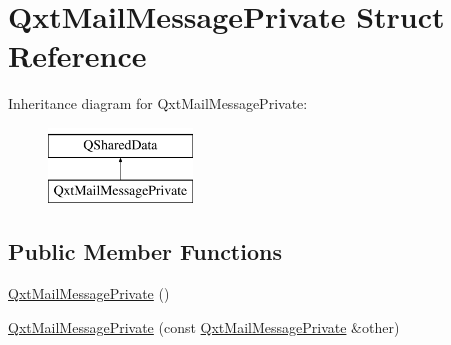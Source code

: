 \hypertarget{struct_qxt_mail_message_private}{\section{Qxt\-Mail\-Message\-Private Struct Reference}
\label{struct_qxt_mail_message_private}
}
Inheritance diagram for Qxt\-Mail\-Message\-Private\-:\begin{figure}[H]
\begin{center}
\leavevmode
\includegraphics[height=2.000000cm]{struct_qxt_mail_message_private}
\end{center}
\end{figure}
\subsection*{Public Member Functions}
\begin{DoxyCompactItemize}
\item 
\hyperlink{struct_qxt_mail_message_private_ad836429745423ffab3c7e9c2fcd326de}{Qxt\-Mail\-Message\-Private} ()
\item 
\hyperlink{struct_qxt_mail_message_private_ab5b98477b7988026a5c473e6cf924d33}{Qxt\-Mail\-Message\-Private} (const \hyperlink{struct_qxt_mail_message_private}{Qxt\-Mail\-Message\-Private} \&other)
\end{DoxyCompactItemize}
